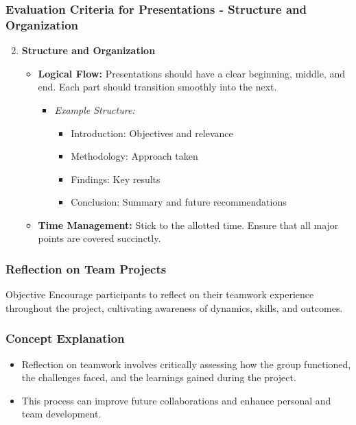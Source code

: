 \documentclass[aspectratio=169]{beamer}
\begin{document}
\begin{frame}[fragile]
    \frametitle{Evaluation Criteria for Presentations - Structure and Organization}
    \begin{enumerate}
        \setcounter{enumi}{1}
        \item \textbf{Structure and Organization}
        \begin{itemize}
            \item \textbf{Logical Flow:} Presentations should have a clear beginning, middle, and end. Each part should transition smoothly into the next.
            \begin{itemize}
                \item \textit{Example Structure:}
                \begin{itemize}
                    \item Introduction: Objectives and relevance
                    \item Methodology: Approach taken
                    \item Findings: Key results
                    \item Conclusion: Summary and future recommendations
                \end{itemize}
            \end{itemize}
            \item \textbf{Time Management:} Stick to the allotted time. Ensure that all major points are covered succinctly.
        \end{itemize}
    \end{enumerate}
\end{frame}

\begin{frame}[fragile]
    \frametitle{Reflection on Team Projects}
    \begin{block}{Objective}
        Encourage participants to reflect on their teamwork experience throughout the project, cultivating awareness of dynamics, skills, and outcomes.
    \end{block}
\end{frame}

\begin{frame}[fragile]
    \frametitle{Concept Explanation}
    \begin{itemize}
        \item Reflection on teamwork involves critically assessing how the group functioned, the challenges faced, and the learnings gained during the project.
        \item This process can improve future collaborations and enhance personal and team development.
    \end{itemize}
\end{frame}
\end{document}
